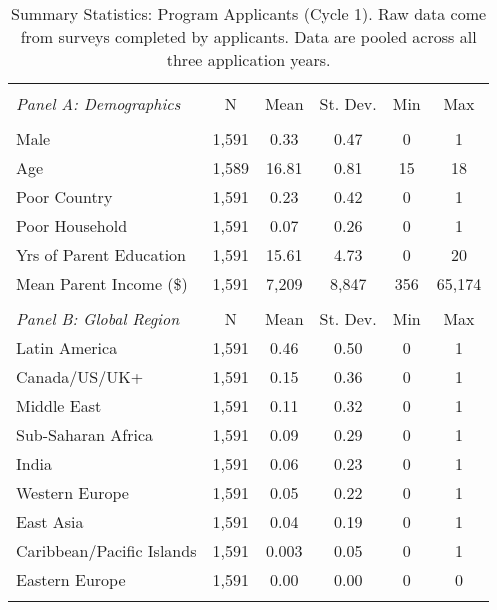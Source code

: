     \begin{table}[!htbp]
        \centering
        \caption{Summary Statistics: Program Applicants (Cycle 1). Raw data come from surveys completed by applicants. Data are pooled across all three application years. }
        \label{tab:c1_demo}
    \begin{tabular}{@{\extracolsep{5pt}}lccccc} 
    \\[-1.8ex]\hline 
    \hline \\[-1.8ex] 
    \emph{Panel A: Demographics} & \multicolumn{1}{c}{N} & \multicolumn{1}{c}{Mean} & \multicolumn{1}{c}{St. Dev.} & \multicolumn{1}{c}{Min} & \multicolumn{1}{c}{Max} \\ 
    \hline \\[-1.8ex] 
    Male & 1,591 & 0.33 & 0.47 & 0 & 1 \\ 
    Age & 1,589 & 16.81 & 0.81 & 15 & 18 \\ 
    Poor Country & 1,591 & 0.23 & 0.42 & 0 & 1 \\ 
    Poor Household & 1,591 & 0.07 & 0.26 & 0 & 1 \\ 
    Yrs of Parent Education & 1,591 & 15.61 & 4.73 & 0 & 20 \\ 
    Mean Parent Income (\$) & 1,591 & 7,209 & 8,847 & 356 & 65,174 \\ 
    \hline
    & & & & & \\
    \emph{Panel B: Global Region} & \multicolumn{1}{c}{N} & \multicolumn{1}{c}{Mean} & \multicolumn{1}{c}{St. Dev.} & \multicolumn{1}{c}{Min} & \multicolumn{1}{c}{Max} \\ 
    \hline
    Latin America & 1,591 & 0.46 & 0.50 & 0 & 1 \\ 
    Canada/US/UK+ & 1,591 & 0.15 & 0.36 & 0 & 1 \\ 
    Middle East & 1,591 & 0.11 & 0.32 & 0 & 1 \\ 
    Sub-Saharan Africa & 1,591 & 0.09 & 0.29 & 0 & 1 \\ 
    India & 1,591 & 0.06 & 0.23 & 0 & 1 \\ 
    Western Europe & 1,591 & 0.05 & 0.22 & 0 & 1 \\ 
    East Asia & 1,591 & 0.04 & 0.19 & 0 & 1 \\ 
    Caribbean/Pacific Islands & 1,591 & 0.003 & 0.05 & 0 & 1 \\ 
    Eastern Europe & 1,591 & 0.00 & 0.00 & 0 & 0 \\ 
    \hline \hline \\[-1.8ex] 
    \end{tabular} 
    \end{table} 
    
